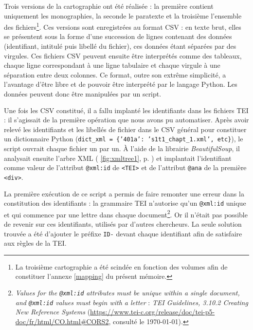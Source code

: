 Trois versions de la cartographie ont été réalisée : la première contient uniquement les monographies, la seconde le paratexte et la troisième l'ensemble des fichiers\footnote{La troisième cartographie a été scindée en fonction des volumes afin de constituer l'annexe \ref{mapping} du présent mémoire.}. Ces versions sont enregistrées au format CSV : en texte brut, elles se présentent sous la forme d'une succession de lignes contenant des données (identifiant, intitulé puis libellé du fichier), ces données étant séparées par des virgules. Ces fichiers CSV peuvent ensuite être interprétés comme des tableaux, chaque ligne correspondant à une ligne tabulaire et chaque virgule à une séparation entre deux colonnes. Ce format, outre son extrême simplicité, a l'avantage d'être libre et de pouvoir être interprété par le langage Python. Les données peuvent donc être manipulées par un script.

Une fois les CSV constitué, il a fallu implanté les identifiants dans les fichiers TEI : il s'agissait de la première opération que nous avons pu automatiser. Après avoir relevé les identifiants et les libellés de fichier dans le CSV général pour constituer un dictionnaire Python (\texttt{dict\_xml = \{'401a': 's1t1\_chapt\_1.xml', etc\}}), le script ouvrait chaque fichier un par un. À l'aide de la librairie \textit{BeautifulSoup}, il analysait ensuite l'arbre XML (\fig{} \ref{fig:xmltree1}, p. \pageref{fig:xmltree1}) et implantait l'identifiant comme valeur de l'attribut \texttt{@xml:id} de \texttt{<TEI>} et de l'attribut \texttt{@ana} de la première \texttt{<div>}.

La première exécution de ce script a permis de faire remonter une erreur dans la constitution des identifiants : la grammaire TEI n'autorise qu'un \texttt{@xml:id} unique et qui commence par une lettre dans chaque document\footnote{\og \textit{Values for the \texttt{@xml:id} attributes must be unique within a single document, and \texttt{@xml:id} values must begin with a letter}\fg{} : \textit{TEI Guidelines, 3.10.2 Creating New Reference Systems} (\url{https://www.tei-c.org/release/doc/tei-p5-doc/fr/html/CO.html\#CORS2}, consulté le \today).}. Or il n'était pas possible de revenir sur ces identifiants, utilisés par d'autres chercheurs. La seule solution trouvée a été d'ajouter le préfixe \texttt{ID-} devant chaque identifiant afin de satisfaire aux règles de la TEI.

